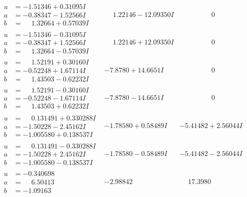 \documentclass[1p]{elsarticle_modified}
\theoremstyle{definition}
\begin{document}
$$\begin{array}{c|c|c}
\begin{aligned}
u &= -1.51346 + 0.31095 I \\
a &= -0.38347 - 1.52566 I \\
b &= \phantom{-}1.32664 + 0.57039 I\end{aligned}
 & \phantom{-}1.22146 - 12.09350 I & \phantom{-0.000000 } 0 \\ \hline\begin{aligned}
u &= -1.51346 - 0.31095 I \\
a &= -0.38347 + 1.52566 I \\
b &= \phantom{-}1.32664 - 0.57039 I\end{aligned}
 & \phantom{-}1.22146 + 12.09350 I & \phantom{-0.000000 } 0 \\ \hline\begin{aligned}
u &= \phantom{-}1.52191 + 0.30160 I \\
a &= -0.52248 + 1.67114 I \\
b &= \phantom{-}1.43503 - 0.62232 I\end{aligned}
 & -7.8780 + 14.6651 I & \phantom{-0.000000 } 0 \\ \hline\begin{aligned}
u &= \phantom{-}1.52191 - 0.30160 I \\
a &= -0.52248 - 1.67114 I \\
b &= \phantom{-}1.43503 + 0.62232 I\end{aligned}
 & -7.8780 - 14.6651 I & \phantom{-0.000000 } 0 \\ \hline\begin{aligned}
u &= \phantom{-}0.131491 + 0.330288 I \\
a &= -1.50228 - 2.45162 I \\
b &= -1.005580 + 0.138537 I\end{aligned}
 & -1.78580 + 0.58489 I & -5.41482 + 2.56044 I \\ \hline\begin{aligned}
u &= \phantom{-}0.131491 - 0.330288 I \\
a &= -1.50228 + 2.45162 I \\
b &= -1.005580 - 0.138537 I\end{aligned}
 & -1.78580 - 0.58489 I & -5.41482 - 2.56044 I \\ \hline\begin{aligned}
u &= -0.340698\phantom{ +0.000000I} \\
a &= \phantom{-}6.50413\phantom{ +0.000000I} \\
b &= -1.09163\phantom{ +0.000000I}\end{aligned}
 & -2.98842\phantom{ +0.000000I} & \phantom{-}17.3980\phantom{ +0.000000I} \\ \hline\begin{aligned}

\end{aligned}
\end{array}$$
\end{document}
